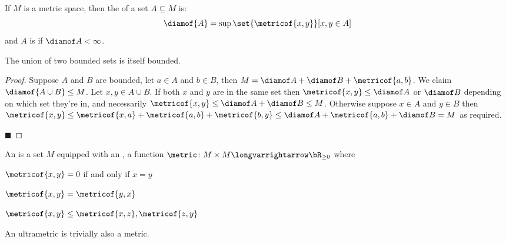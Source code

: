 \documentclass[10pt]{article}
\begin{document}


\bigskip

\begin{defn*}

    If $M$ is a metric space, then the  of a set $A\subseteq M$ is:
    \[ \diamof{A} = \sup\set{\metricof{x,y}}[x,y\in A] \]
    and $A$ is  if $\diamof A<\infty$.

\end{defn*}

\begin{prop*}

    The union of two bounded sets is itself bounded.

\end{prop*}

\begin{proof}

    Suppose $A$ and $B$ are bounded, let $a\in A$ and $b\in B$, then $M=\diamof A+\diamof B+\metricof{a,b}$.
    We claim $\diamof{A\cup B}\leq M$.
    Let $x,y\in A\cup B$.
    If both $x$ and $y$ are in the same set then $\metricof{x,y}\leq\diamof A$ or $\diamof B$ depending on which set they're in, and necessarily $\metricof{x,y}\leq\diamof A+\diamof B\leq M$.
    Otherwise suppose $x\in A$ and $y\in B$ then $\metricof{x,y}\leq\metricof{x,a}+\metricof{a,b}+\metricof{b,y}\leq\diamof A+\metricof{a,b}+\diamof B=M$ as required.

    \hfill$\blacksquare$

\end{proof}

\begin{defn*}

    An  is a set $M$ equipped with an , a function $\metric\colon M\times M\longvarrightarrow\bR_{\geq0}$ where
    \benum
        \item $\metricof{x,y}=0$ if and only if $x=y$
        \item $\metricof{x,y}=\metricof{y,x}$
        \item $\metricof{x,y}\leq\maxof{\metricof{x,z}, \metricof{z,y}}$
    \eenum

    An ultrametric is trivially also a metric.

\end{defn*}
\end{document}
